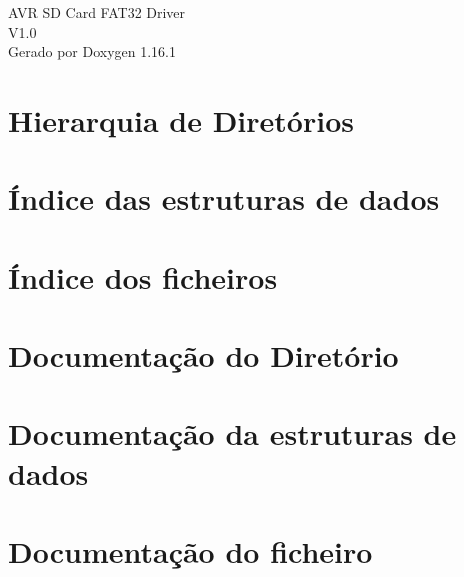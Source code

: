\documentclass[twoside]{book}
\newcommand{\+}{\discretionary{\mbox{\scriptsize$\hookleftarrow$}}{}{}}
\newcommand{\clearemptydoublepage}{%
    \newpage{\pagestyle{empty}\cleardoublepage}%
  }
\begin{document}
  \raggedbottom
    \hypersetup{pageanchor=false,
                bookmarksnumbered=true,
                pdfencoding=unicode
               }
  \begin{titlepage}
  \vspace*{7cm}
  \begin{center}%
  {\Large AVR SD Card FAT32 Driver}\\
  [1ex]\large V1.\+0 \\
  \vspace*{1cm}
  {\large Gerado por Doxygen 1.16.1}\\
  \end{center}
  \end{titlepage}
  \clearemptydoublepage
  \tableofcontents
  \clearemptydoublepage
  \hypersetup{pageanchor=true}

\chapter{Hierarquia de Diretórios}

\chapter{Índice das estruturas de dados}

\chapter{Índice dos ficheiros}

\chapter{Documentação do Diretório}



\chapter{Documentação da estruturas de dados}






\chapter{Documentação do ficheiro}










\end{document}
